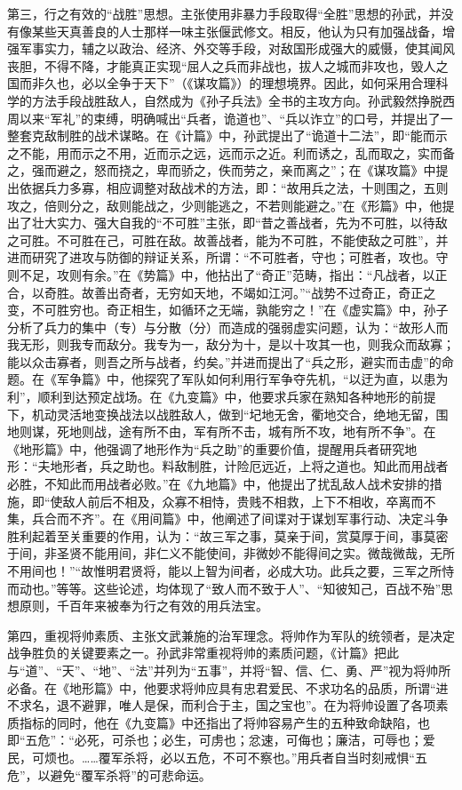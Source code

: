 \documentclass[12pt,UTF8]{ctexbook}
\begin{document}
第三，行之有效的“战胜”思想。主张使用非暴力手段取得“全胜”思想的孙武，并没有像某些天真善良的人士那样一味主张偃武修文。相反，他认为只有加强战备，增强军事实力，辅之以政治、经济、外交等手段，对敌国形成强大的威慑，使其闻风丧胆，不得不降，才能真正实现“屈人之兵而非战也，拔人之城而非攻也，毁人之国而非久也，必以全争于天下”（《谋攻篇》）的理想境界。因此，如何采用合理科学的方法手段战胜敌人，自然成为《孙子兵法》全书的主攻方向。孙武毅然挣脱西周以来“军礼”的束缚，明确喊出“兵者，诡道也”、“兵以诈立”的口号，并提出了一整套克敌制胜的战术谋略。在《计篇》中，孙武提出了“诡道十二法”，即“能而示之不能，用而示之不用，近而示之远，远而示之近。利而诱之，乱而取之，实而备之，强而避之，怒而挠之，卑而骄之，佚而劳之，亲而离之”；在《谋攻篇》中提出依据兵力多寡，相应调整对敌战术的方法，即：“故用兵之法，十则围之，五则攻之，倍则分之，敌则能战之，少则能逃之，不若则能避之。”在《形篇》中，他提出了壮大实力、强大自我的“不可胜”主张，即“昔之善战者，先为不可胜，以待敌之可胜。不可胜在己，可胜在敌。故善战者，能为不可胜，不能使敌之可胜”，并进而研究了进攻与防御的辩证关系，所谓：“不可胜者，守也；可胜者，攻也。守则不足，攻则有余。”在《势篇》中，他拈出了“奇正”范畴，指出：“凡战者，以正合，以奇胜。故善出奇者，无穷如天地，不竭如江河。”“战势不过奇正，奇正之变，不可胜穷也。奇正相生，如循环之无端，孰能穷之！”在《虚实篇》中，孙子分析了兵力的集中（专）与分散（分）而造成的强弱虚实问题，认为：“故形人而我无形，则我专而敌分。我专为一，敌分为十，是以十攻其一也，则我众而敌寡；能以众击寡者，则吾之所与战者，约矣。”并进而提出了“兵之形，避实而击虚”的命题。在《军争篇》中，他探究了军队如何利用行军争夺先机，“以迂为直，以患为利”，顺利到达预定战场。在《九变篇》中，他要求兵家在熟知各种地形的前提下，机动灵活地变换战法以战胜敌人，做到“圮地无舍，衢地交合，绝地无留，围地则谋，死地则战，途有所不由，军有所不击，城有所不攻，地有所不争”。在《地形篇》中，他强调了地形作为“兵之助”的重要价值，提醒用兵者研究地形：“夫地形者，兵之助也。料敌制胜，计险厄远近，上将之道也。知此而用战者必胜，不知此而用战者必败。”在《九地篇》中，他提出了扰乱敌人战术安排的措施，即“使敌人前后不相及，众寡不相恃，贵贱不相救，上下不相收，卒离而不集，兵合而不齐”。在《用间篇》中，他阐述了间谍对于谋划军事行动、决定斗争胜利起着至关重要的作用，认为：“故三军之事，莫亲于间，赏莫厚于间，事莫密于间，非圣贤不能用间，非仁义不能使间，非微妙不能得间之实。微哉微哉，无所不用间也！”“故惟明君贤将，能以上智为间者，必成大功。此兵之要，三军之所恃而动也。”等等。这些论述，均体现了“致人而不致于人”、“知彼知己，百战不殆”思想原则，千百年来被奉为行之有效的用兵法宝。

第四，重视将帅素质、主张文武兼施的治军理念。将帅作为军队的统领者，是决定战争胜负的关键要素之一。孙武非常重视将帅的素质问题，《计篇》把此与“道”、“天”、“地”、“法”并列为“五事”，并将“智、信、仁、勇、严”视为将帅所必备。在《地形篇》中，他要求将帅应具有忠君爱民、不求功名的品质，所谓“进不求名，退不避罪，唯人是保，而利合于主，国之宝也”。在为将帅设置了各项素质指标的同时，他在《九变篇》中还指出了将帅容易产生的五种致命缺陷，也即“五危”：“必死，可杀也；必生，可虏也；忿速，可侮也；廉洁，可辱也；爱民，可烦也。……覆军杀将，必以五危，不可不察也。”用兵者自当时刻戒惧“五危”，以避免“覆军杀将”的可悲命运。
\end{document}
